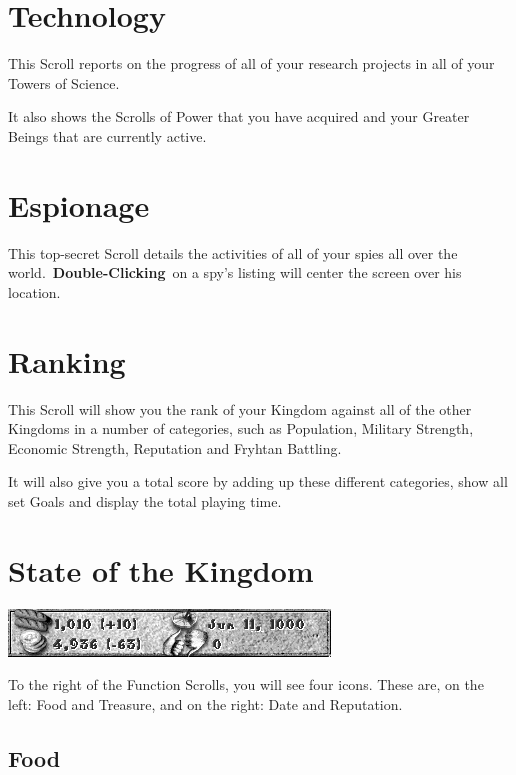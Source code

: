 \section{Technology}

This Scroll reports on the progress of all of your research projects in all of your Towers of Science.

It also shows the Scrolls of Power that you have acquired and your Greater Beings that are currently active.

\section{Espionage}

This top-secret Scroll details the activities of all of your spies all over the world. \textbf{Double-Clicking} on a spy’s listing will center the screen over his location.

\section{Ranking}

This Scroll will show you the rank of your Kingdom against all of the other Kingdoms in a number of categories, such as Population, Military Strength, Economic Strength, Reputation and Fryhtan Battling.

It will also give you a total score by adding up these different categories, show all set Goals and display the total playing time.

\section{State of the Kingdom}

\begin{center}
	\includegraphics[width=0.7\linewidth]{Ifoodgoldetc}
\end{center}

To the right of the Function Scrolls, you will see four icons. These are, on the left: Food and Treasure, and on the right: Date and Reputation.

\subsection{Food}

